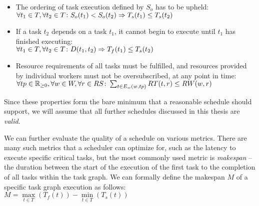 \begin{itemize}
	\item The ordering of task execution defined by $S_o$ has to be upheld: \\
	      $\forall t_1\in{}T, \forall t_2\in{}T\colon S_o(t_1) < S_o(t_2) \Rightarrow T_s(t_1) \leq T_s(t_2)$
	\item If a task $t_2$ depends on a task $t_1$, it cannot begin to
	      execute until $t_1$ has finished executing: \\ $\forall t_1\in{}T, \forall t_2\in{}T\colon D(t_1, t_2) \Rightarrow T_f(t_1) \leq T_s(t_2)$
	\item Resource requirements of all tasks must be fulfilled, and resources provided by
	individual workers must not be oversubscribed, at any point in time: \\
	      $\forall tp\in\mathbb{R}_{\geq{}0}, \forall w\in{}W, \forall r\in{}RS\colon
		      \sum_{t\in{}E_w(w, tp)} RT(t, r) \leq RW(w, r)$
\end{itemize}

Since these properties form the bare minimum that a reasonable schedule should support, we will
assume that all further schedules discussed in this thesis are \emph{valid}.

We can further evaluate the quality of a schedule on various metrics. There are many such metrics
that a scheduler can optimize for, such as the latency to execute specific
critical tasks, but the most commonly used metric is \emph{makespan} -- the duration
between the start of the execution of the first task to the completion of all tasks within the task
graph. We can formally define the makespan $M$ of a specific task graph
execution as follows: \\
$M = \max\limits_{t \in T}(T_f(t)) - \min\limits_{t \in T}(T_s(t))$

